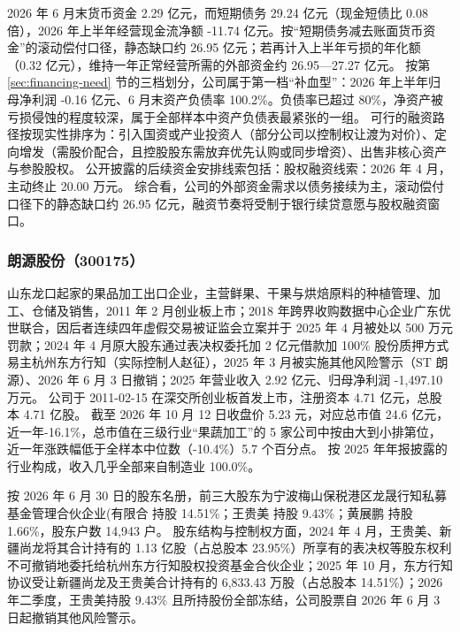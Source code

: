  2026 年 6 月末货币资金 2.29 亿元，而短期债务 29.24 亿元（现金短债比 0.08 倍），2026 年上半年经营现金流净额 -11.74 亿元。按“短期债务减去账面货币资金”的滚动偿付口径，静态缺口约 26.95 亿元；若再计入上半年亏损的年化额（0.32 亿元），维持一年正常经营所需的外部资金约 26.95---27.27 亿元。 按第 \ref{sec:financing-need} 节的三档划分，公司属于第一档“补血型”：2026 年上半年归母净利润 -0.16 亿元、6 月末资产负债率 100.2\%。负债率已超过 80\%，净资产被亏损侵蚀的程度较深，属于全部样本中资产负债表最紧张的一组。 可行的融资路径按现实性排序为：引入国资或产业投资人（部分公司以控制权让渡为对价）、定向增发（需股价配合，且控股股东需放弃优先认购或同步增资）、出售非核心资产与参股股权。 公开披露的后续资金安排线索包括：股权融资线索：2026 年 4 月，主动终止 20.00 万元。 综合看，公司的外部资金需求以债务接续为主，滚动偿付口径下的静态缺口约 26.95 亿元，融资节奏将受制于银行续贷意愿与股权融资窗口。




\subsubsection{朗源股份（300175）}
\label{co:300175}

 山东龙口起家的果品加工出口企业，主营鲜果、干果与烘焙原料的种植管理、加工、仓储及销售，2011 年 2 月创业板上市；2018 年跨界收购数据中心企业广东优世联合，因后者连续四年虚假交易被证监会立案并于 2025 年 4 月被处以 500 万元罚款；2024 年 4 月原大股东通过表决权委托加 2 亿元借款加 100\% 股份质押方式易主杭州东方行知（实际控制人赵征），2025 年 3 月被实施其他风险警示（ST 朗源）、2026 年 6 月 3 日撤销；2025 年营业收入 2.92 亿元、归母净利润 -1,497.10 万元。 公司于 2011-02-15 在深交所创业板首发上市，注册资本 4.71 亿元，总股本 4.71 亿股。 截至 2026 年 10 月 12 日收盘价 5.23 元，对应总市值 24.6 亿元，近一年-16.1\%，总市值在三级行业“果蔬加工”的 5 家公司中按由大到小排第位，近一年涨跌幅低于全样本中位数（-10.4\%）5.7 个百分点。 按 2025 年年报披露的行业构成，收入几乎全部来自制造业 100.0\%。

 按 2026 年 6 月 30 日的股东名册，前三大股东为宁波梅山保税港区龙晟行知私募基金管理合伙企业(有限合 持股 14.51\%；王贵美 持股 9.43\%；黄展鹏 持股 1.66\%，股东户数 14,943 户。 股东结构与控制权方面，2024 年 4 月，王贵美、新疆尚龙将其合计持有的 1.13 亿股（占总股本 23.95\%）所享有的表决权等股东权利不可撤销地委托给杭州东方行知股权投资基金合伙企业；2025 年 10 月，东方行知协议受让新疆尚龙及王贵美合计持有的 6,833.43 万股（占总股本 14.51\%）；2026 年二季度，王贵美持股 9.43\% 且所持股份全部冻结，公司股票自 2026 年 6 月 3 日起撤销其他风险警示。

